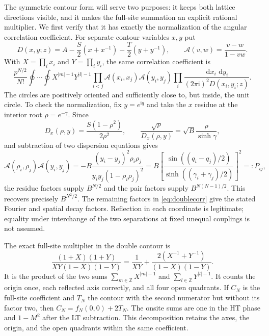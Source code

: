 \documentclass[11pt]{article}
\numberwithin{equation}{section}
\theoremstyle{definition}
\newcommand{\Z}{\mathbb Z}
\newcommand{\dd}{\,\mathrm d}
\newcommand{\ii}{\mathrm i}
\newcommand{\cA}{\mathscr A}
\begin{document}
The symmetric contour form will serve two purposes: it keeps both
lattice directions visible, and it makes the full-site summation an
explicit rational multiplier. We first verify that it has exactly the
normalization of the angular correlation coefficient.
For separate contour variables $x,y$ put
\begin{equation}\label{eq:Dpoly}
 D(x,y;z)=A-\frac S2(x+x^{-1})-\frac T2(y+y^{-1}),\qquad
 \cA(v,w)=\frac{v-w}{1-vw}.
\end{equation}
With $X=\prod_i x_i$ and $Y=\prod_i y_i$, the same correlation
coefficient is
\begin{equation}\label{eq:doublecorr}
 \frac{p^{N/2}}{N!}\oint\cdots\oint
 X^{|m|-1}Y^{|l|-1}
 \prod_{i<j}\cA(x_i,x_j)\cA(y_i,y_j)
 \prod_i\frac{\dd x_i\,\dd y_i}{(2\pi\ii)^2D(x_i,y_i;z)}.
\end{equation}
The circles are positively oriented and sufficiently close to, but inside,
the unit circle. To check the normalization, fix $y=e^{\ii q}$ and
take the $x$ residue at the interior root $\rho=e^{-\gamma}$.
Since
\[
 D_x(\rho,y)=\frac{S(1-\rho^2)}{2\rho^2},\qquad
 \frac{\sqrt p}{D_x(\rho,y)}=\sqrt B\frac{\rho}{\sinh\gamma},
\]
and subtraction of two dispersion equations gives
\begin{equation}\label{eq:cancelpair}
 \cA(\rho_i,\rho_j)\cA(y_i,y_j)
 =-B\frac{(y_i-y_j)^2\rho_i\rho_j}
           {y_iy_j(1-\rho_i\rho_j)^2}
 =B\left[\frac{\sin((q_i-q_j)/2)}
               {\sinh((\gamma_i+\gamma_j)/2)}\right]^2=:P_{ij},
\end{equation}
the residue factors supply $B^{N/2}$ and the pair factors supply
$B^{N(N-1)/2}$. This recovers precisely $B^{N^2/2}$.
The remaining factors in \eqref{eq:doublecorr} give the stated Fourier
and spatial decay factors. Reflection in each coordinate is legitimate;
equality under interchange of the two separations at fixed unequal
couplings is not assumed.

The exact full-site multiplier in the double contour is
\begin{equation}\label{eq:allsites}
 \frac{(1+X)(1+Y)}{XY(1-X)(1-Y)}
 =\frac1{XY}+\frac{2(X^{-1}+Y^{-1})}{(1-X)(1-Y)}.
\end{equation}
It is the product of the two sums $\sum_{m\in\Z}X^{|m|-1}$ and
$\sum_{l\in\Z}Y^{|l|-1}$. It counts the origin once, each reflected
axis correctly, and all four open quadrants. If $C_N$ is the full-site
coefficient and $T_N$ the contour with the second numerator but without
its factor two, then $C_N=f_N(0,0)+2T_N$. The onsite sums are one in
the HT phase and $1-M^2$ after the LT subtraction. This decomposition retains the axes, the origin, and the open quadrants
within the same coefficient.
\end{document}

